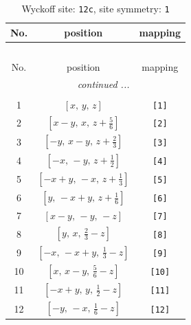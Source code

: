 \documentclass[fleqn,8pt]{jsarticle}
\begin{document}
\begin{longtable}{ccc}
\caption{Wyckoff site: {\tt 12c}, site symmetry: {\tt 1}}
 \\
 \hline \hline
No. & position & mapping \\ \hline \endfirsthead

\multicolumn{2}{l}{\tablename\ \thetable{}} \\
 \hline \hline
No. & position & mapping \\ \hline \endhead

 \hline \hline
\multicolumn{2}{r}{\footnotesize\it continued ...} \\ \endfoot

 \hline \hline
\multicolumn{2}{r}{} \\ \endlastfoot

1 & $\left[ x,\, y,\, z \right]$ & {\tt [1]} \\ \hline
2 & $\left[ x - y,\, x,\, z + \frac{5}{6} \right]$ & {\tt [2]} \\ \hline
3 & $\left[ - y,\, x - y,\, z + \frac{2}{3} \right]$ & {\tt [3]} \\ \hline
4 & $\left[ - x,\, - y,\, z + \frac{1}{2} \right]$ & {\tt [4]} \\ \hline
5 & $\left[ - x + y,\, - x,\, z + \frac{1}{3} \right]$ & {\tt [5]} \\ \hline
6 & $\left[ y,\, - x + y,\, z + \frac{1}{6} \right]$ & {\tt [6]} \\ \hline
7 & $\left[ x - y,\, - y,\, - z \right]$ & {\tt [7]} \\ \hline
8 & $\left[ y,\, x,\, \frac{2}{3} - z \right]$ & {\tt [8]} \\ \hline
9 & $\left[ - x,\, - x + y,\, \frac{1}{3} - z \right]$ & {\tt [9]} \\ \hline
10 & $\left[ x,\, x - y,\, \frac{5}{6} - z \right]$ & {\tt [10]} \\ \hline
11 & $\left[ - x + y,\, y,\, \frac{1}{2} - z \right]$ & {\tt [11]} \\ \hline
12 & $\left[ - y,\, - x,\, \frac{1}{6} - z \right]$ & {\tt [12]} \\
\end{longtable}
\end{document}
